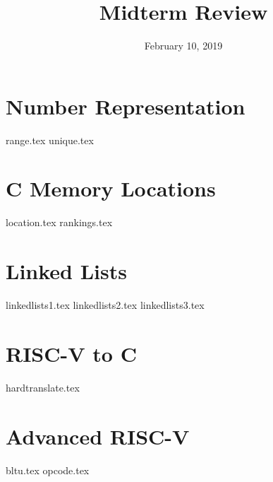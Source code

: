 \documentclass[11pt]{exam}
\title{Midterm Review}
\date{February 10, 2019}
\begin{document}
\maketitle

\section{Number Representation}
\begin{questions}
{range.tex}
{unique.tex}
\end{questions}
\newpage

\section{C Memory Locations}
\begin{questions}
{location.tex}
{rankings.tex}
\end{questions}
\newpage

\section{Linked Lists}
\begin{questions}
{linkedlists1.tex}
{linkedlists2.tex}
{linkedlists3.tex}
\end{questions}
\newpage

\section{RISC-V to C}
\begin{questions}
{hardtranslate.tex}
\end{questions}
\newpage

\section{Advanced RISC-V}
\begin{questions}
{bltu.tex}
{opcode.tex}
\end{questions}
\newpage
\end{document}
